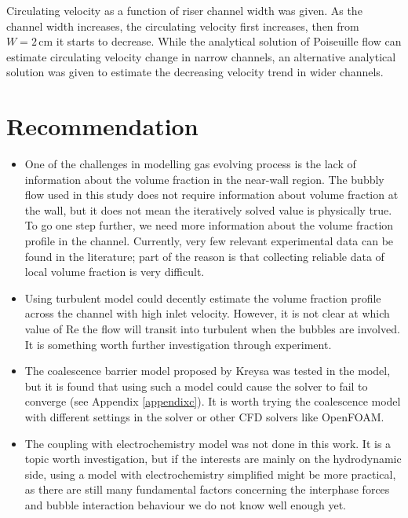 Circulating velocity as a function of riser channel width was given. As the channel width increases, the circulating velocity first increases, then from $W = 2 \, \mathrm{cm}$ it starts to decrease. While the analytical solution of Poiseuille flow can estimate circulating velocity change in narrow channels, an alternative analytical solution was given to estimate the decreasing velocity trend in wider channels.

\section{Recommendation}

\begin{itemize}
    \item One of the challenges in modelling gas evolving process is the lack of information about the volume fraction in the near-wall region. The bubbly flow used in this study does not require information about volume fraction at the wall, but it does not mean the iteratively solved value is physically true. To go one step further, we need more information about the volume fraction profile in the channel. Currently, very few relevant experimental data can be found in the literature; part of the reason is that collecting reliable data of local volume fraction is very difficult.
    \item Using turbulent model could decently estimate the volume fraction profile across the channel with high inlet velocity. However, it is not clear at which value of $\mathrm{Re}$ the flow will transit into turbulent when the bubbles are involved. It is something worth further investigation through experiment.
    \item The coalescence barrier model proposed by Kreysa \cite{Kreysa1985} was tested in the model, but it is found that using such a model could cause the solver to fail to converge (see Appendix \ref{appendixc}). It is worth trying the coalescence model with different settings in the solver or other CFD solvers like OpenFOAM.
    \item The coupling with electrochemistry model was not done in this work. It is a topic worth investigation, but if the interests are mainly on the hydrodynamic side, using a model with electrochemistry simplified might be more practical, as there are still many fundamental factors concerning the interphase forces and bubble interaction behaviour we do not know well enough yet.
\end{itemize}



